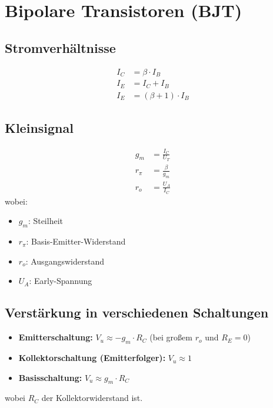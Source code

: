\documentclass{article}
\begin{document}
\section*{Bipolare Transistoren (BJT)}
\begin{minipage}[t]{0.5\textwidth}
    \subsection*{Stromverhältnisse}
        \begin{align*}
            I_C &= \beta \cdot I_B \\
            I_E &= I_C + I_B \\
            I_E &= (\beta + 1) \cdot I_B
        \end{align*}
    
\end{minipage}
\begin{minipage}[t]{0.5\textwidth}
\subsection*{Kleinsignal}
    \begin{align*}
        g_m &= \frac{I_C}{U_T} \\
        r_\pi &= \frac{\beta}{g_m} \\
        r_o &= \frac{U_A}{I_C}
    \end{align*}
    wobei:
    \begin{itemize}
        \item $g_m$: Steilheit
        \item $r_\pi$: Basis-Emitter-Widerstand
        \item $r_o$: Ausgangswiderstand
        \item $U_A$: Early-Spannung
    \end{itemize}
\end{minipage}
\subsection*{Verstärkung in verschiedenen Schaltungen}
\begin{itemize}
    \item \textbf{Emitterschaltung:} $V_u \approx -g_m \cdot R_C$ (bei großem $r_o$ und $R_E = 0$)
    \item \textbf{Kollektorschaltung (Emitterfolger):} $V_u \approx 1$
    \item \textbf{Basisschaltung:} $V_u \approx g_m \cdot R_C$
\end{itemize}
wobei $R_C$ der Kollektorwiderstand ist.
\end{document}
